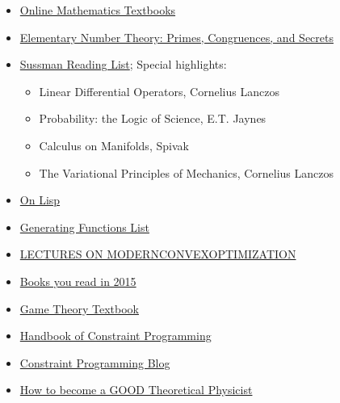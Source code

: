 \begin{itemize}

	\item \href{http://people.math.gatech.edu/~cain/textbooks/onlinebooks.html}{Online Mathematics Textbooks}

	\item \href{http://wstein.org/ent/}{Elementary Number Theory: Primes, Congruences, and Secrets}
	
	\item \href{http://aurellem.org/thoughts/html/sussman-reading-list.html}{Sussman
  Reading List}; Special highlights:

	\begin{itemize}
		\item Linear Differential Operators, Cornelius Lanczos
		\item Probability: the Logic of Science, E.T. Jaynes
		\item Calculus on Manifolds, Spivak
		\item The Variational Principles of Mechanics, Cornelius Lanczos
	\end{itemize}

	\item \href{http://www.paulgraham.com/onlisptext.html}{On Lisp}

	\item \href{http://lacim.uqam.ca/~plouffe/articles/MasterThesis.pdf}{Generating
  Functions List}

	\item \href{http://www2.isye.gatech.edu/~nemirovs/Lect_ModConvOpt.pdf}{LECTURES
  ON MODERNCONVEXOPTIMIZATION}

	\item \href{https://news.ycombinator.com/item?id=10783219}{Books you read in
  2015}

	\item  \href{http://arxiv.org/abs/1512.06808}{Game Theory Textbook}

	\item \href{http://cswww.essex.ac.uk/CSP/papers/CP_Handbook-20060315-final.pdf}{Handbook  of Constraint Programming}
	
	\item \href{http://www.hakank.org/constraint_programming_blog/}{Constraint
  Programming Blog}

	\item \href{http://www.staff.science.uu.nl/~gadda001/goodtheorist/index.html}{How to become a GOOD Theoretical Physicist}
  

\end{itemize}
